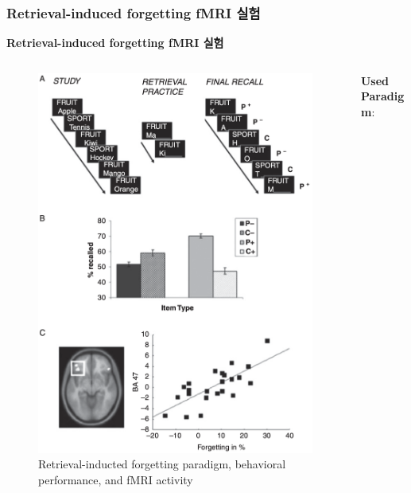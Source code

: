 \documentclass{beamer}
\begin{document}
\subsubsection{Retrieval-induced forgetting fMRI 실험}
\begin{frame}{\textbf{Retrieval-induced forgetting fMRI 실험}}
  \begin{columns}
    \begin{column}{0.38\textwidth}
      \begin{figure}
        \includegraphics[width=\textwidth]{image/Retrieval-induced_forgetting}
        \caption{Retrieval-inducted forgetting paradigm, behavioral performance, and fMRI activity}
      \end{figure}
    \end{column}
    \hfill
    \begin{column}{0.6\textwidth}
      \textbf{Used Paradigm}:
      \vspace{-0.5em}

\end{column}
\end{columns}
\end{frame}
\end{document}
